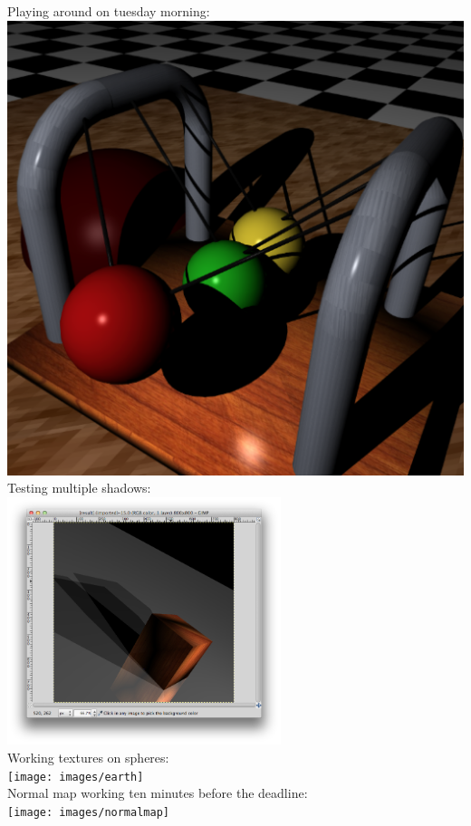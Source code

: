 \documentclass[a4paper,11pt]{article}
\begin{document}
\newpage Playing around on tuesday morning:\\
\includegraphics[scale=0.5]{images/playing}\\

Testing multiple shadows:\\
\includegraphics[keepaspectratio,width=8.0cm]{images/mshadows}\\

\newpage Working textures on spheres:\\
\texttt{[image: images/earth]}\\

Normal map working ten minutes before the deadline:\\
\texttt{[image: images/normalmap]}\\
\end{document}
